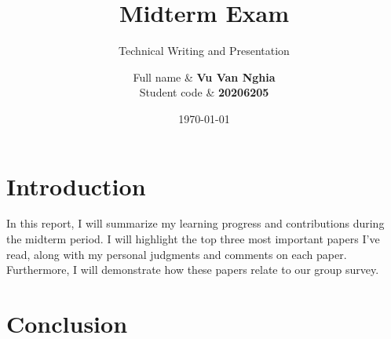 \documentclass[12pt, twoside]{article}
\title{Midterm Exam}
\subtitle{Technical Writing and Presentation}
\author{
    Full name & \textbf{Vu Van Nghia} \\
    Student code &   \textbf{20206205} \\[1cm]
}
\date{\today}
\begin{document}
\maketitlepage
\tableofcontents
\newpage
\section{Introduction}
In this report, I will summarize my learning progress and contributions during the midterm period. I will highlight the top three most important papers I've read, along with my personal judgments and comments on each paper. Furthermore, I will demonstrate how these papers relate to our group survey.
\section{Conclusion}





\renewcommand{\refname}{References}


\end{document}
